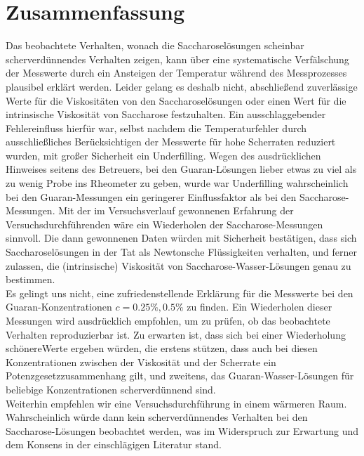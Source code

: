\documentclass[11pt,a4paper,oneside]{scrartcl}
\begin{document}
\newpage
\section{Zusammenfassung}
Das beobachtete Verhalten, wonach die Saccharoselösungen scheinbar scherverdünnendes Verhalten zeigen, kann über eine systematische Verfälschung der Messwerte durch ein Ansteigen der Temperatur während des Messprozesses plausibel erklärt werden. Leider gelang es deshalb nicht, abschließend zuverlässige Werte für die Viskositäten von den Saccharoselösungen oder einen Wert für die intrinsische Viskosität von Saccharose festzuhalten. Ein ausschlaggebender Fehlereinfluss hierfür war, selbst nachdem die Temperaturfehler durch ausschließliches Berücksichtigen der Messwerte für hohe Scherraten reduziert wurden, mit großer Sicherheit ein Underfilling. Wegen des ausdrücklichen Hinweises seitens des Betreuers, bei den Guaran-Lösungen lieber etwas zu viel als zu wenig Probe ins Rheometer zu geben, wurde war Underfilling wahrscheinlich bei den Guaran-Messungen ein geringerer Einflussfaktor als bei den Saccharose-Messungen. Mit der im Versuchsverlauf gewonnenen Erfahrung der Versuchsdurchführenden wäre ein Wiederholen der Saccharose-Messungen sinnvoll. Die dann gewonnenen Daten würden mit Sicherheit bestätigen, dass sich Saccharoselösungen in der Tat als Newtonsche Flüssigkeiten verhalten, und ferner zulassen, die (intrinsische) Viskosität von Saccharose-Wasser-Lösungen genau zu bestimmen.\\
Es gelingt uns nicht, eine zufriedenstellende Erklärung für die Messwerte bei den Guaran-Konzentrationen $c=0.25\%,0.5\%$ zu finden. Ein Wiederholen dieser Messungen wird ausdrücklich empfohlen, um zu prüfen, ob das beobachtete Verhalten reproduzierbar ist. Zu erwarten ist, dass sich bei einer Wiederholung \glqq schönere\Grqq Werte ergeben würden, die erstens stützen, dass auch bei diesen Konzentrationen zwischen der Viskosität und der Scherrate ein Potenzgesetzzusammenhang gilt, und zweitens, das Guaran-Wasser-Lösungen für beliebige Konzentrationen scherverdünnend sind. \\
Weiterhin empfehlen wir eine Versuchsdurchführung in einem wärmeren Raum. Wahrscheinlich würde dann kein scherverdünnendes Verhalten bei den Saccharose-Lösungen beobachtet werden, was im Widerspruch zur Erwartung und dem Konsens in der einschlägigen Literatur stand.
\end{document}
